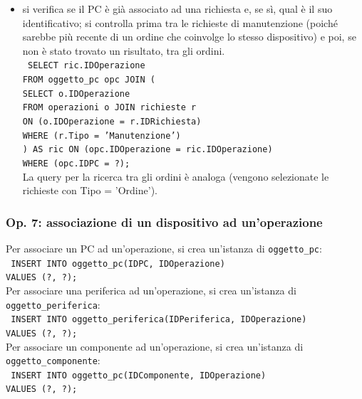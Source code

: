 \documentclass[a4paper,12pt]{report}
\begin{document}
\begin{itemize}[listparindent=\parindent]
{    FROM sistema\_operativo os JOIN pc ON (os.IDPC = pc.IDPC) \\
    WHERE (os.IDPC = ?);
    }
    \item si verifica se il PC è già associato ad una richiesta e, se sì, qual è il suo identificativo; si controlla prima tra le richieste di manutenzione (poiché sarebbe più recente di un ordine che coinvolge lo stesso dispositivo) e poi, se non è stato trovato un risultato, tra gli ordini. \\
    \texttt{
    SELECT ric.IDOperazione \\
    FROM oggetto\_pc opc JOIN ( \\
        \indent \indent SELECT o.IDOperazione \\
        \indent \indent FROM operazioni o JOIN richieste r \\
        \indent \indent ON (o.IDOperazione = r.IDRichiesta) \\
        \indent \indent WHERE (r.Tipo = 'Manutenzione') \\
    ) AS ric ON (opc.IDOperazione = ric.IDOperazione) \\
    WHERE (opc.IDPC = ?);
    } \\
    La query per la ricerca tra gli ordini è analoga (vengono selezionate le richieste con Tipo = 'Ordine').
\end{itemize}

\subsubsection{Op. 7: associazione di un dispositivo ad un’operazione}

Per associare un PC ad un'operazione, si crea un'istanza di \texttt{oggetto\_pc}: \\
\texttt{
INSERT INTO oggetto\_pc(IDPC, IDOperazione) \\
VALUES (?, ?);
} \\

\noindent Per associare una periferica ad un'operazione, si crea un'istanza di \texttt{oggetto\_periferica}: \\
\texttt{
INSERT INTO oggetto\_periferica(IDPeriferica, IDOperazione) \\
VALUES (?, ?);
} \\

\noindent Per associare un componente ad un'operazione, si crea un'istanza di \texttt{oggetto\_componente}: \\
\texttt{
INSERT INTO oggetto\_pc(IDComponente, IDOperazione) \\
VALUES (?, ?);
}
\end{document}
